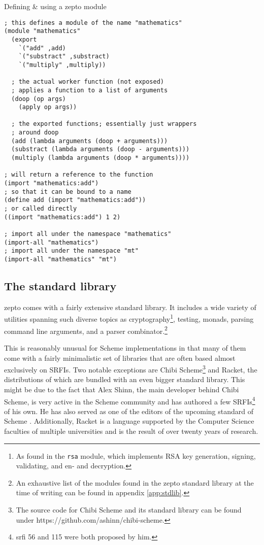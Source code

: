 \documentclass[oneside,11pt,xetex]{scrbook}
\begin{document}
\begin{listing}[H]
\caption{Defining \& using a zepto module}
\begin{verbatim}
; this defines a module of the name "mathematics"
(module "mathematics"
  (export
    `("add" ,add)
    `("substract" ,substract)
    `("multiply" ,multiply))

  ; the actual worker function (not exposed)
  ; applies a function to a list of arguments
  (doop (op args)
    (apply op args))

  ; the exported functions; essentially just wrappers
  ; around doop
  (add (lambda arguments (doop + arguments)))
  (substract (lambda arguments (doop - arguments)))
  (multiply (lambda arguments (doop * arguments))))

; will return a reference to the function
(import "mathematics:add")
; so that it can be bound to a name
(define add (import "mathematics:add"))
; or called directly
((import "mathematics:add") 1 2)

; import all under the namespace "mathematics"
(import-all "mathematics")
; import all under the namespace "mt"
(import-all "mathematics" "mt")
\end{verbatim}
\label{fig:zepmod}
\end{listing}

\subsection{The standard library}

zepto comes with a fairly extensive standard library. It includes a wide
variety of utilities spanning such diverse topics as cryptography\footnote{As found
in the \texttt{rsa} module, which implements RSA key generation, signing,
validating, and en- and decryption.}, testing, monads, parsing command line
arguments, and a parser combinator.\footnote{An exhaustive list of the modules
found in the zepto standard library at the time of writing can be found in appendix
\ref{app:stdlib}.}

This is reasonably unusual for Scheme implementations in that many of them
come with a fairly minimalistic set of libraries that are often based almost
exclusively on SRFIs. Two notable exceptions are Chibi Scheme\footnote{The source
code for Chibi Scheme and its standard library can be found under
https://github.com/ashinn/chibi-scheme.} and Racket, the distributions of which
are bundled with an even bigger standard library. This might be due to the fact
that Alex Shinn, the main developer behind Chibi Scheme, is very active in the
Scheme community and has authored a few SRFIs\footnote{\gls{srfi} 56 \parencite{SRFI56}
and 115 \parencite{SRFI115} were both proposed by him.} of his own. He has also served
as one of the editors of the upcoming standard of Scheme \parencite{R7RS}.
Additionally, Racket is a language supported by the Computer Science faculties of
multiple universities and is the result of over twenty years of research.
\end{document}
